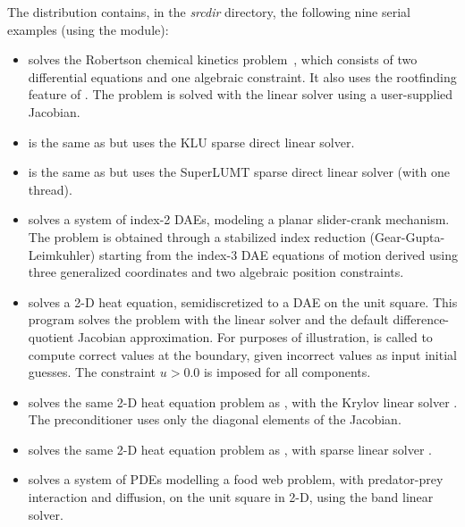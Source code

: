 \vspace{0.2in}\noindent
The {\ida} distribution contains, in the {\em srcdir}
directory, the following nine serial examples (using the {\nvecs} module):
\begin{itemize}

\item {}
  solves the Robertson chemical kinetics problem~\cite{Rob:66}, which consists
  of two differential equations and one algebraic constraint.  It also uses
  the rootfinding feature of {\ida}.
  The problem is solved with the {\sunlinsoldense} linear solver using
  a user-supplied Jacobian.

\item {}
  is the same as  but uses the KLU sparse direct linear solver.

\item {}
  is the same as  but uses the SuperLUMT sparse direct linear
  solver (with one thread).

\item {}
  solves a system of index-2 DAEs, modeling a planar slider-crank mechanism.
  The problem is obtained through a stabilized index reduction (Gear-Gupta-Leimkuhler)
  starting from the index-3 DAE equations of motion derived using three generalized
  coordinates and two algebraic position constraints.

\item {}
  solves a 2-D heat equation, semidiscretized to a DAE on the unit square.
  This program solves the problem with the {\sunlinsolband} linear solver and
  the default difference-quotient Jacobian approximation. For purposes of
  illustration,  is called to compute correct values at the
  boundary, given incorrect values as input initial guesses. The constraint
  $u > 0.0$ is imposed for all components.

\item {}
  solves the same 2-D heat equation problem as , with the Krylov
  linear solver {\sunlinsolspgmr}. The preconditioner uses only the diagonal elements
  of the Jacobian.

\item {}
  solves the same 2-D heat equation problem as , with
  sparse linear solver {\sunlinsolklu}.

\item {}
  solves a system of PDEs modelling a food web problem, with predator-prey
  interaction and diffusion, on the unit square in 2-D, using the band
  linear solver.


\end{itemize}
